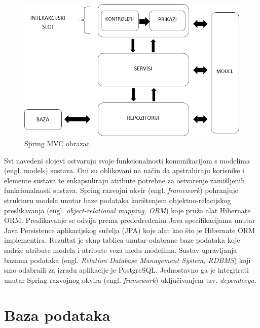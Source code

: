 	\begin{figure}[H]
		\includegraphics[scale=0.6]{./Slike/mvc-spring.png}
		\centering
		\caption{Spring MVC obrazac}
		\label{fig:promjene}
	\end{figure}
	\noindent Svi navedeni slojevi ostvaruju svoje funkcionalnosti komunikacijom s modelima (engl. models) sustava. Oni su oblikovani na način da apstrahiraju korisnike i elemente sustava te enkapsuliraju atribute potrebne za ostvarenje zamišljenih funkcionalnosti sustava. 
	\newline 
	Spring razvojni okvir (engl. \textit{framework}) pohranjuje strukturu modela unutar baze podataka korištenjem objektno-relacijskog preslikavanja (engl. \textit{object-relational mapping, ORM}) koje pruža alat Hibernate ORM. Preslikavanje se odvija prema predodređenim Java specifikacijama unutar Java Persistence aplikacijskog sučelja (JPA) koje alat kao što je Hibernate ORM implementira. Rezultat je skup tablica unutar odabrane baze podataka koje sadrže atribute modela i atribute veza među modelima.
	\newline
	Sustav upravljanja bazama podataka (engl. \textit{Relation Database Management System, RDBMS}) koji smo odabraili za izradu aplikacije je PostgreSQL. Jednostavno ga je integrirati unutar Spring razvojnog okvira (engl. \textit{framework}) uključivanjem tzv. \textit{dependecya}.
	
			
	\section{Baza podataka}
		

